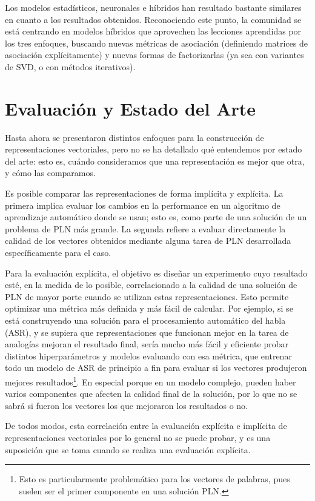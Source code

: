 Los modelos estadísticos, neuronales e híbridos han resultado bastante similares en cuanto a los
resultados obtenidos. Reconociendo este punto, la comunidad se está centrando en modelos híbridos
que aprovechen las lecciones aprendidas por los tres enfoques, buscando nuevas métricas de
asociación (definiendo matrices de asociación explícitamente) y nuevas formas de factorizarlas (ya
sea con variantes de SVD, o con métodos iterativos).


\section{Evaluación y Estado del Arte}

Hasta ahora se presentaron distintos enfoques para la construcción de representaciones vectoriales,
pero no se ha detallado qué entendemos por estado del arte: esto es, cuándo consideramos que una
representación es mejor que otra, y cómo las comparamos.

Es posible comparar las representaciones de forma implícita y explícita. La primera implica evaluar
los cambios en la performance en un algoritmo de aprendizaje automático donde se usan; esto es, como
parte de una solución de un problema de PLN más grande. La segunda refiere a evaluar directamente la
calidad de los vectores obtenidos mediante alguna tarea de PLN desarrollada específicamente para el
caso.

Para la evaluación explícita, el objetivo es diseñar un experimento cuyo resultado esté, en la
medida de lo posible, correlacionado a la calidad de una solución de PLN de mayor porte cuando se
utilizan estas representaciones. Esto permite optimizar una métrica más definida y más fácil de
calcular. Por ejemplo, si se está construyendo una solución para el procesamiento automático del
habla (ASR), y se supiera que representaciones que funcionan mejor en la tarea de analogías mejoran
el resultado final, sería mucho más fácil y eficiente probar distintos hiperparámetros y modelos
evaluando con esa métrica, que entrenar todo un modelo de ASR de principio a fin para evaluar si los
vectores produjeron mejores resultados\footnote{Esto es particularmente problemático para los
vectores de palabras, pues suelen ser el primer componente en una solución PLN.}. En especial porque
en un modelo complejo, pueden haber varios componentes que afecten la calidad final de la solución,
por lo que no se sabrá si fueron los vectores los que mejoraron los resultados o no.

De todos modos, esta correlación entre la evaluación explícita e implícita de representaciones
vectoriales por lo general no se puede probar, y es una suposición que se toma cuando se realiza una
evaluación explícita.


